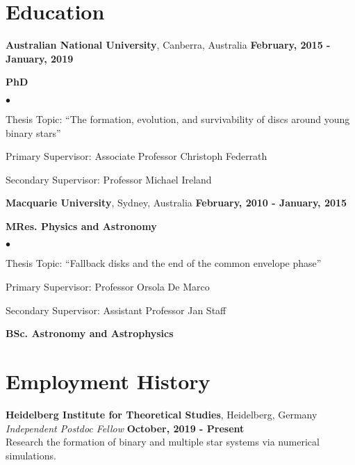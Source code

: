 \documentclass[margin,line]{res}
\newenvironment{list1}{
	\begin{list}{\ding{113}}{%
			\setlength{\itemsep}{0in}
			\setlength{\parsep}{0in} \setlength{\parskip}{0in}
			\setlength{\topsep}{0in} \setlength{\partopsep}{0in} 
			\setlength{\leftmargin}{0.17in}}}{\end{list}}
\newenvironment{list2}{
	\begin{list}{$\bullet$}{%
			\setlength{\itemsep}{0in}
			\setlength{\parsep}{0in} \setlength{\parskip}{0in}
			\setlength{\topsep}{0in} \setlength{\partopsep}{0in} 
			\setlength{\leftmargin}{0.2in}}}{\end{list}}
\begin{document}
\begin{resume}
		\section{\sc Education}
		{\bf Australian National University}, Canberra, Australia \hfill {\bf February, 2015 - January, 2019}\\
		\vspace*{-.1in}
		\begin{list1}
			\item[] {\bf PhD}
			\begin{list2}
				\vspace*{.05in}
				\item Thesis Topic:  ``The formation, evolution, and survivability of discs around young binary stars'' 
				\item Primary Supervisor: Associate Professor Christoph Federrath
				\item Secondary Supervisor: Professor Michael Ireland
			\end{list2}
		\end{list1}
		{\bf Macquarie University}, Sydney, Australia \hfill {\bf February, 2010 - January, 2015}\\ 
		\vspace*{-.1in}
		\begin{list1}
			\item[] {\bf MRes. Physics and Astronomy}
			\begin{list2}
				\vspace*{.05in}
				\item Thesis Topic:  ``Fallback disks and the end of the common envelope phase'' 
				\item Primary Supervisor:  Professor Orsola De Marco
				\item Secondary Supervisor: Assistant Professor Jan Staff
			\end{list2}
			\vspace*{.05in}
			\item[] {\bf BSc. Astronomy and Astrophysics}
		\end{list1}

\vspace*{-0.1cm}

		\section{\sc Employment History}
            {\bf Heidelberg Institute for Theoretical Studies}, Heidelberg, Germany\\
		{\em Independent Postdoc Fellow} \hfill {\bf October, 2019 - Present}\\
		Research the formation of binary and multiple star systems via numerical simulations.\\
            \vspace{-1cm}\\
            

\end{resume}
\end{document}
